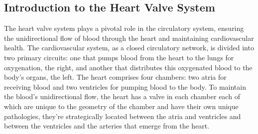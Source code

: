 \subsection{Introduction to the Heart Valve System}
The heart valve system plays a pivotal role in the circulatory system, ensuring the unidirectional flow of blood through the heart and maintaining cardiovascular health. The cardiovascular system, as a closed circulatory network, is divided into two primary circuits: one that pumps blood from the heart to the lungs for oxygenation, the right, and another that distributes this oxygenated blood to the body's organs, the left. The heart comprises four chambers: two atria for receiving blood and two ventricles for pumping blood to the body. To maintain the blood's unidirectional flow, the heart has a valve in each chamber each of which are unique to the geometry of the chamber and have their own unique pathologies, they're strategically located between the atria and ventricles and between the ventricles and the arteries that emerge from the heart. ~


